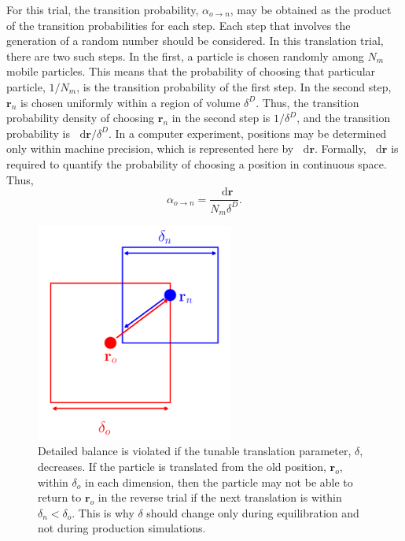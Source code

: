 \documentclass[
  9pt,
  bestpractices,
  pubversion,
]{livecoms}
\newcommand*\diff{\mathop{}\!\mathrm{d}}
\begin{document}
For this trial, the transition probability, $\alpha_{o\rightarrow n}$, may be obtained as the product of the transition probabilities for each step.
Each step that involves the generation of a random number should be considered.
In this translation trial, there are two such steps.
In the first, a particle is chosen randomly among $N_m$ mobile particles.
This means that the probability of choosing that particular particle, $1/N_m$, is the transition probability of the first step.
In the second step, $\mathbf{r}_n$ is chosen uniformly within a region of volume $\delta^D$.
Thus, the transition probability density of choosing $\mathbf{r}_n$ in the second step is $1/\delta^D$, and the transition probability is $\diff\mathbf{r}/\delta^D$.
In a computer experiment, positions may be determined only within machine precision, which is represented here by $\diff\mathbf{r}$.
Formally, $\diff\mathbf{r}$ is required to quantify the probability of choosing a position in continuous space.
Thus,
\begin{equation}
\alpha_{o\rightarrow n} = \frac{\diff\mathbf{r}}{N_m \delta^D}.
\label{eq:lhs_disp_forward}
\end{equation}

\begin{figure}
\begin{centering}
\includegraphics[width=6.5cm]{../figures/lhs_nvt.pdf}
\caption{
Detailed balance is violated if the tunable translation parameter, $\delta$, decreases.
If the particle is translated from the old position, $\mathbf{r}_o$, within $\delta_o$ in each dimension, then the particle may not be able to return to $\mathbf{r}_o$ in the reverse trial if the next translation is within $\delta_n<\delta_o$.
This is why $\delta$ should change only during equilibration and not during production simulations.
}
\label{fig:lhs_nvt}
\end{centering}
\end{figure}
\end{document}
